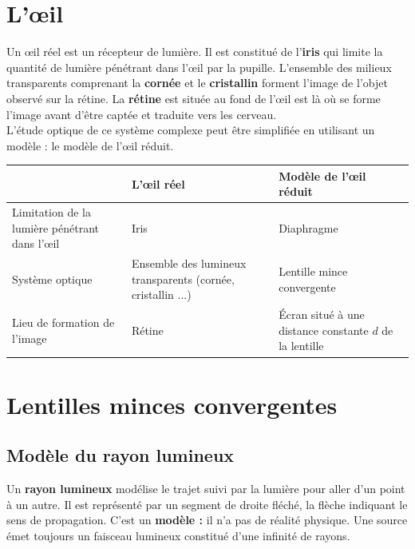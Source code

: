 \documentclass[a4paper,11pt,fleqn]{article}%
\begin{document}
\maketitle
\section{L'\oe il }
Un \oe il réel est un récepteur de lumière. Il est constitué de l'\textbf{iris} qui limite la quantité de lumière pénétrant dans l'\oe il par la pupille. L'ensemble des milieux transparents comprenant la \textbf{cornée} et le \textbf{cristallin} forment l'image de l'objet observé sur la rétine. La \textbf{rétine} est située au fond de l'\oe il est là où se forme l'image avant d'être captée et traduite vers les cerveau.\\
L'étude optique de ce système complexe peut être simplifiée en utilisant un modèle : le modèle de l'\oe il réduit.
\begin{table}[h!]
    \centering
    \begin{tabular}{|>{\centering}m{.25\linewidth}|>{\centering}m{.25\linewidth}|>{\centering\arraybackslash}m{.25\linewidth}|}
    \hline  & L'\oe il réel & Modèle de l'\oe il réduit\\
    \hline Limitation de la lumière pénétrant dans l'\oe il & Iris & Diaphragme\\
    \hline Système optique & Ensemble des lumineux transparents (cornée, cristallin ...) & Lentille mince convergente\\
    \hline Lieu de formation de l'image & Rétine & Écran situé à une distance constante $d$ de la lentille\\
    \hline 
    \end{tabular}
\end{table}

\section{Lentilles minces convergentes}
    \subsection{Modèle du rayon lumineux}
    Un \textbf{rayon lumineux} modélise le trajet suivi par la lumière pour aller d'un point à un autre. Il est représenté par un segment de droite fléché, la flèche indiquant le sens de propagation. C'est un \textbf{modèle :} il n'a pas de réalité physique. Une source émet toujours un faisceau lumineux constitué d'une infinité de rayons.
\end{document}
